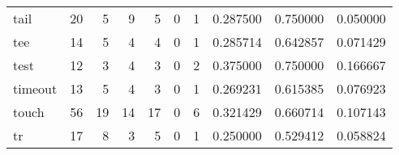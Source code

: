 \begin{longtable}{lrrrrrrrrr}
tail      &                                      20 &                                                  5 &                                                  9 &                                                  5 &                                                  0 &                                                  1 &                                           0.287500 &                               0.750000 &                             0.050000 \\
tee       &                                      14 &                                                  5 &                                                  4 &                                                  4 &                                                  0 &                                                  1 &                                           0.285714 &                               0.642857 &                             0.071429 \\
test      &                                      12 &                                                  3 &                                                  4 &                                                  3 &                                                  0 &                                                  2 &                                           0.375000 &                               0.750000 &                             0.166667 \\
timeout   &                                      13 &                                                  5 &                                                  4 &                                                  3 &                                                  0 &                                                  1 &                                           0.269231 &                               0.615385 &                             0.076923 \\
touch     &                                      56 &                                                 19 &                                                 14 &                                                 17 &                                                  0 &                                                  6 &                                           0.321429 &                               0.660714 &                             0.107143 \\
tr        &                                      17 &                                                  8 &                                                  3 &                                                  5 &                                                  0 &                                                  1 &                                           0.250000 &                               0.529412 &                             0.058824 \\

\end{longtable}
